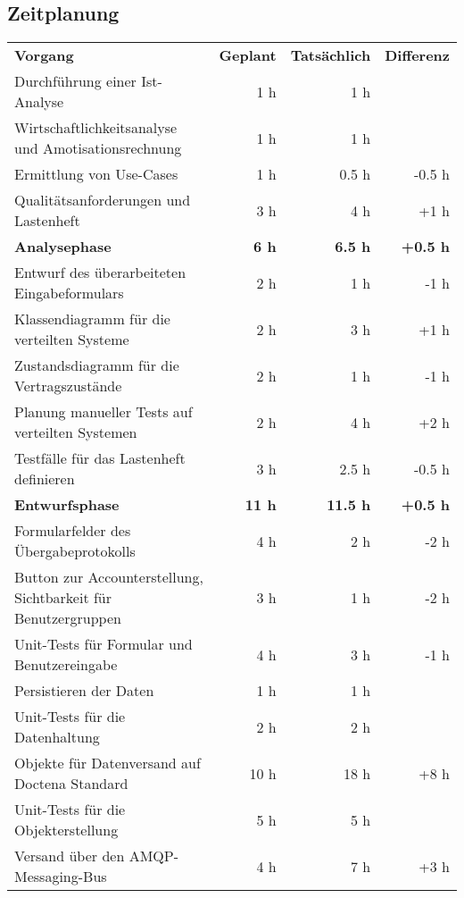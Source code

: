 \subsection{Zeitplanung}
\label{subsec:Zeitplan}

\begin{tabularx}{\textwidth}{Xrrr}
\rowcolor{heading}\textbf{Vorgang} & \textbf{Geplant} & \textbf{Tatsächlich} & \textbf{Differenz} \\
Durchführung einer Ist-Analyse & 1 h   & 1 h   &  \\
\rowcolor{odd}Wirtschaftlichkeitsanalyse und Amotisationsrechnung & 1 h   & 1 h   &  \\
Ermittlung von Use-Cases & 1 h   & 0.5 h   & -0.5 h \\
\rowcolor{odd}Qualitätsanforderungen und Lastenheft & 3 h   & 4 h   & +1 h \\
\rowcolor{heading}\textbf{Analysephase} & \textbf{6 h} & \textbf{6.5 h} & \textbf{+0.5 h} \\
Entwurf des überarbeiteten Eingabeformulars & 2 h & 1 h & -1 h \\
\rowcolor{odd}Klassendiagramm für die verteilten Systeme & 2 h & 3 h & +1 h \\
Zustandsdiagramm für die Vertragszustände & 2 h & 1 h & -1 h \\
\rowcolor{odd}Planung manueller Tests auf verteilten Systemen & 2 h & 4 h & +2 h \\
Testfälle für das Lastenheft definieren & 3 h & 2.5 h & -0.5 h \\
\rowcolor{heading}\textbf{Entwurfsphase} & \textbf{11 h} & \textbf{11.5 h} & \textbf{+0.5 h} \\
Formularfelder des Übergabeprotokolls & 4 h & 2 h & -2 h \\
\rowcolor{odd}Button zur Accounterstellung, Sichtbarkeit für Benutzergruppen & 3 h & 1 h & -2 h \\
Unit-Tests für Formular und Benutzereingabe & 4 h & 3 h & -1 h \\
\rowcolor{odd}Persistieren der Daten & 1 h & 1 h &  \\
Unit-Tests für die Datenhaltung & 2 h & 2 h &  \\
\rowcolor{odd}Objekte für Datenversand auf Doctena Standard & 10 h & 18 h & +8 h \\
Unit-Tests für die Objekterstellung & 5 h & 5 h &  \\
\rowcolor{odd}Versand über den \ac{AMQP}-Messaging-Bus & 4 h & 7 h & +3 h \\

\end{tabularx}
